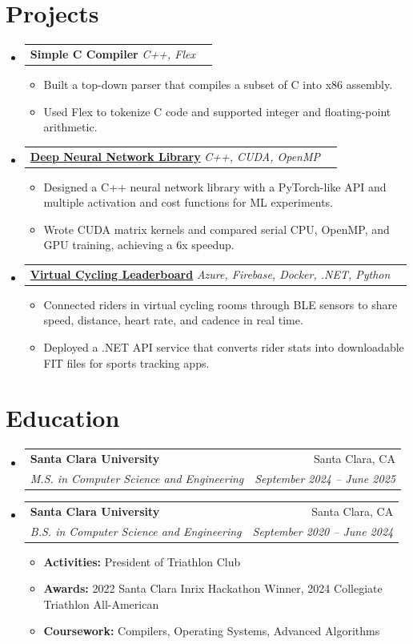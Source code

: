 \documentclass[11pt]{article}
\makeatletter
\newcommand{\resumeItem}[1]{
  \item\small{
    {#1 \vspace{-2pt}}
  }
}
\newcommand{\resumeSubheading}[4]{
  \vspace{-2pt}\item
    \begin{tabular*}{0.97\textwidth}[t]{l@{\extracolsep{\fill}}r}
      \textbf{#1} & #2 \\
      \textit{\small#3} & \textit{\small #4} \\
    \end{tabular*}\vspace{-7pt}
}
\newcommand{\resumeProjectHeading}[2]{
    \vspace{-2pt}\item
    \begin{tabular*}{0.97\textwidth}{l@{\extracolsep{\fill}}r}
      \small#1 & #2 \\
    \end{tabular*}\vspace{-7pt}
}
\newcommand{\resumeSubHeadingListStart}{\begin{itemize}[leftmargin=0.15in, label={}]}
\newcommand{\resumeSubHeadingListEnd}{\end{itemize}}
\newcommand{\resumeItemListStart}{\begin{itemize}[itemsep=3pt]}
\newcommand{\resumeItemListEnd}{\end{itemize}\vspace{-5pt}}
\makeatother
\begin{document}
\section{Projects}
    \vspace{3pt}   
    \resumeSubHeadingListStart
    \resumeProjectHeading
        {\textbf{Simple C Compiler} 	\textbar{} \emph{C++, Flex}}{}
        \resumeItemListStart
            \resumeItem{Built a top-down parser that compiles a subset of C into x86 assembly.}
            \resumeItem{Used Flex to tokenize C code and supported integer and floating-point arithmetic.}
        \resumeItemListEnd
     \resumeProjectHeading
        {\href{https://github.com/8coolguy/distributed-backpropagation}{\textbf{Deep Neural Network Library}} 	\textbar{} \emph{C++, CUDA, OpenMP }}{}
        \resumeItemListStart
            \resumeItem{Designed a C++ neural network library with a PyTorch-like API and multiple activation and cost functions for ML experiments.}
            \resumeItem{Wrote CUDA matrix kernels and compared serial CPU, OpenMP, and GPU training, achieving a 6x speedup.}
        \resumeItemListEnd
    \resumeProjectHeading
        {\href{https://github.com/8coolguy/leaderboard_app}{\textbf{Virtual Cycling Leaderboard}} 	\textbar{} \emph{Azure, Firebase, Docker, .NET, Python}}{}
        \resumeItemListStart
            \resumeItem{Connected riders in virtual cycling rooms through BLE sensors to share speed, distance, heart rate, and cadence in real time.}
            \resumeItem{Deployed a .NET API service that converts rider stats into downloadable FIT files for sports tracking apps.}
        \resumeItemListEnd
    \resumeSubHeadingListEnd
\section{Education}
  \resumeSubHeadingListStart
    \resumeSubheading
      {Santa Clara University}{Santa Clara, CA}
      {M.S. in Computer Science and Engineering}{September 2024 -- June 2025}
    \vspace{5pt}
    \resumeSubheading
      {Santa Clara University}{Santa Clara, CA}
      {B.S. in Computer Science and Engineering}{September 2020 -- June 2024}
      \resumeItemListStart
        \resumeItem{\textbf{Activities:} President of Triathlon Club}
        \resumeItem{\textbf{Awards:} 2022 Santa Clara Inrix Hackathon Winner, 2024 Collegiate Triathlon All-American}
        \resumeItem{\textbf{Coursework:} Compilers, Operating Systems, Advanced Algorithms}
      \resumeItemListEnd
  \resumeSubHeadingListEnd
\end{document}
